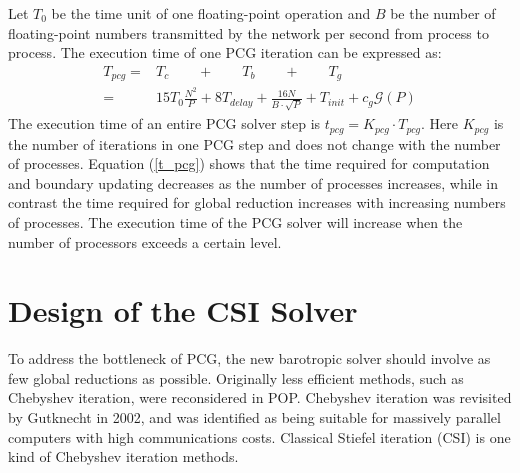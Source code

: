 \documentclass{sig-alternate}
\begin{document}
Let $T_0$ be the time unit of one floating-point operation and $B$ be the number of floating-point numbers transmitted by the network per second from process to process.
The execution time of one PCG iteration can be expressed as:
\begin{eqnarray}
\label{t_pcg}
T_{pcg}=&T_c\qquad + \qquad T_b\qquad +\qquad T_g \qquad \nonumber\\
=&15 T_0\frac{N^2}{P} + 8T_{delay} + \frac{16N}{B\cdot\sqrt{P}}+T_{init} +c_g\mathcal{G}(P)
\end{eqnarray}
The execution time of an entire PCG solver step is $t_{pcg} = K_{pcg}\cdot T_{pcg}$. Here $K_{pcg}$ is the number of iterations in one PCG step and does not change with the number of processes. Equation (\ref{t_pcg}) shows that the time required for computation and boundary updating decreases as the number of processes increases, while in contrast the time required for global reduction increases with increasing numbers of processes. The execution time of the PCG solver will increase when the number of processors exceeds a certain level.


\section{Design of the CSI Solver} \label{se:csi}
To address the bottleneck of PCG, the new barotropic solver should involve as few global reductions as possible. Originally less efficient methods, such as Chebyshev iteration, were reconsidered in POP. Chebyshev iteration was revisited by Gutknecht \cite{gutknecht2002chebyshev} in 2002, and was identified as being suitable for massively parallel computers with high communications costs. Classical Stiefel iteration (CSI) is one kind of Chebyshev iteration methods.
\end{document}
